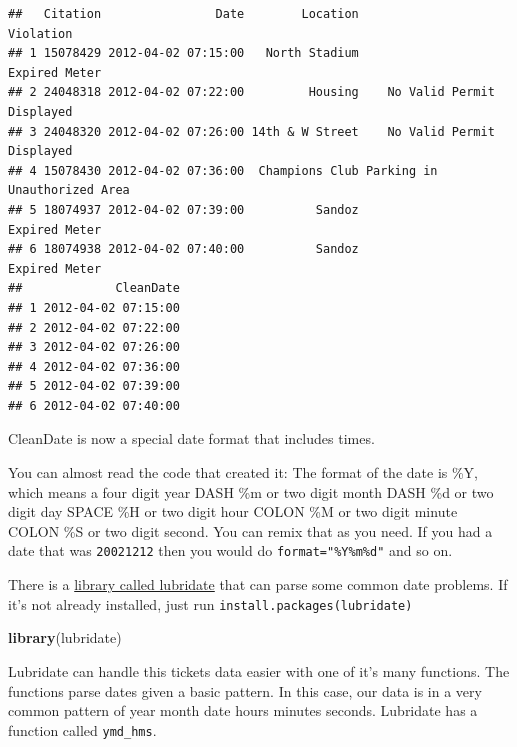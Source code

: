 \documentclass[]{book}
\newenvironment{Shaded}{\begin{snugshade}}{\end{snugshade}}
\newcommand{\DataTypeTok}[1]{\textcolor[rgb]{0.13,0.29,0.53}{#1}}
\newcommand{\KeywordTok}[1]{\textcolor[rgb]{0.13,0.29,0.53}{\textbf{#1}}}
\newcommand{\NormalTok}[1]{#1}
\newcommand{\OperatorTok}[1]{\textcolor[rgb]{0.81,0.36,0.00}{\textbf{#1}}}
\newcommand{\StringTok}[1]{\textcolor[rgb]{0.31,0.60,0.02}{#1}}
\begin{document}
\begin{verbatim}
##   Citation                Date        Location                    Violation
## 1 15078429 2012-04-02 07:15:00   North Stadium                Expired Meter
## 2 24048318 2012-04-02 07:22:00         Housing    No Valid Permit Displayed
## 3 24048320 2012-04-02 07:26:00 14th & W Street    No Valid Permit Displayed
## 4 15078430 2012-04-02 07:36:00  Champions Club Parking in Unauthorized Area
## 5 18074937 2012-04-02 07:39:00          Sandoz                Expired Meter
## 6 18074938 2012-04-02 07:40:00          Sandoz                Expired Meter
##             CleanDate
## 1 2012-04-02 07:15:00
## 2 2012-04-02 07:22:00
## 3 2012-04-02 07:26:00
## 4 2012-04-02 07:36:00
## 5 2012-04-02 07:39:00
## 6 2012-04-02 07:40:00
\end{verbatim}

CleanDate is now a special date format that includes times.

You can almost read the code that created it: The format of the date is \%Y, which means a four digit year DASH \%m or two digit month DASH \%d or two digit day SPACE \%H or two digit hour COLON \%M or two digit minute COLON \%S or two digit second. You can remix that as you need. If you had a date that was \texttt{20021212} then you would do \texttt{format="\%Y\%m\%d"} and so on.

There is a \href{https://cran.r-project.org/web/packages/lubridate/vignettes/lubridate.html}{library called lubridate} that can parse some common date problems. If it's not already installed, just run \texttt{install.packages(\textquotesingle{}lubridate\textquotesingle{})}

\begin{Shaded}
\begin{Highlighting}[]
\KeywordTok{library}\NormalTok{(lubridate)}
\end{Highlighting}
\end{Shaded}

Lubridate can handle this tickets data easier with one of it's many functions. The functions parse dates given a basic pattern. In this case, our data is in a very common pattern of year month date hours minutes seconds. Lubridate has a function called \texttt{ymd\_hms}.

\begin{Shaded}
\end{Shaded}
\end{document}
